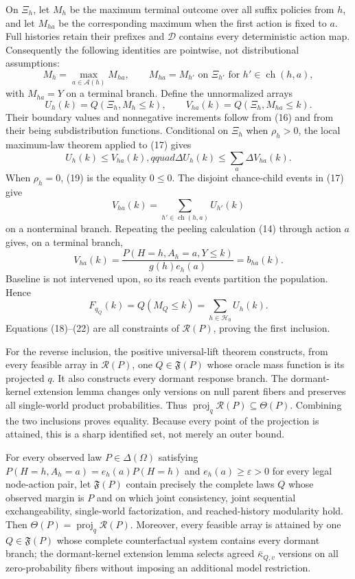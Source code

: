 On \(\Xi_h\), let \(M_h\) be the maximum terminal outcome over all suffix policies from \(h\), and let \(M_{ha}\) be the corresponding maximum when the first action is fixed to \(a\).  Full histories retain their prefixes and \(\mathcal D\) contains every deterministic action map.  Consequently the following identities are pointwise, not distributional assumptions:
\[
 M_h=\max_{a\in\mathcal A(h)}M_{ha},
 \qquad
 M_{ha}=M_{h'}\text{ on }\Xi_{h'}\text{ for }h'\in\operatorname{ch}(h,a),  \tag{17}
\]
with \(M_{ha}=Y\) on a terminal branch.  Define the unnormalized arrays
\[
 U_h(k)=Q(\Xi_h,M_h\leq k),
 \qquad
 V_{ha}(k)=Q(\Xi_h,M_{ha}\leq k).                         \tag{18}
\]
Their boundary values and nonnegative increments follow from (16) and from their being subdistribution functions.  Conditional on \(\Xi_h\) when \(\rho_h>0\), the local maximum-law theorem applied to (17) gives
\[
 U_h(k)\leq V_{ha}(k),qquad
 \Delta U_h(k)\leq\sum_a\Delta V_{ha}(k).                \tag{19}
\]
When \(\rho_h=0\), (19) is the equality \(0\leq0\).  The disjoint chance-child events in (17) give
\[
 V_{ha}(k)=\sum_{h'\in\operatorname{ch}(h,a)}U_{h'}(k)    \tag{20}
\]
on a nonterminal branch.  Repeating the peeling calculation (14) through action \(a\) gives, on a terminal branch,
\[
 V_{ha}(k)=\frac{P(H=h,A_h=a,Y\leq k)}{g(h)e_h(a)}=b_{ha}(k). \tag{21}
\]
Baseline is not intervened upon, so its reach events partition the population.  Hence
\[
 F_{q_Q}(k)=Q(M_Q\leq k)=\sum_{h\in\mathcal H_0}U_h(k).   \tag{22}
\]
Equations (18)--(22) are all constraints of \(\mathcal R(P)\), proving the first inclusion.

For the reverse inclusion, the positive universal-lift theorem constructs, from every feasible array in \(\mathcal R(P)\), one \(Q\in\mathfrak F(P)\) whose oracle mass function is its projected \(q\).  It also constructs every dormant response branch.  The dormant-kernel extension lemma changes only versions on null parent fibers and preserves all single-world product probabilities.  Thus \(\operatorname{proj}_q\mathcal R(P)\subseteq\Theta(P)\).  Combining the two inclusions proves equality.  Because every point of the projection is attained, this is a sharp identified set, not merely an outer bound.

For every observed law \(P\in\Delta(\Omega)\) satisfying \(P(H=h,A_h=a)=e_h(a)P(H=h)\) and \(e_h(a)\geq\varepsilon>0\) for every legal node-action pair, let \(\mathfrak F(P)\) contain precisely the complete laws \(Q\) whose observed margin is \(P\) and on which joint consistency, joint sequential exchangeability, single-world factorization, and reached-history modularity hold. Then \(\Theta(P)=\operatorname{proj}_{q}\mathcal R(P)\). Moreover, every feasible array is attained by one \(Q\in\mathfrak F(P)\) whose complete counterfactual system contains every dormant branch; the dormant-kernel extension lemma selects agreed \(\bar\kappa_{Q,v}\) versions on all zero-probability fibers without imposing an additional model restriction.

